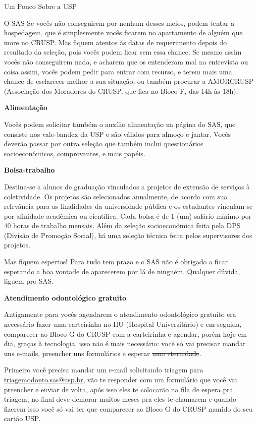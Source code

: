 \begin{secao}{Um Pouco Sobre a USP}
\begin{subsecao}{O SAS}
Se vocês não conseguirem por nenhum desses meios, podem tentar a hospedagem, que é
simplesmente vocês ficarem no apartamento de alguém que more no CRUSP. Mas fiquem
atentos às datas de requerimento depois do resultado da seleção, pois vocês podem
ficar sem essa chance. Se mesmo assim vocês não conseguirem nada,
e acharem que os entenderam mal na entrevista ou coisa assim, vocês podem pedir para
entrar com recurso, e terem mais uma chance de esclarecer melhor a sua situação, ou também
procurar a AMORCRUSP (Associação dos Moradores do CRUSP, que fica no Bloco F, das 14h às 18h).

{\bf Alimentação}

Vocês podem solicitar também o auxílio alimentação na página do SAS, que
consiste nos vale-bandex da USP e são válidos para almoço e jantar. Vocês deverão
passar por outra seleção que também inclui questionários socioeconômicos,
comprovantes, e mais papéis.

{\bf Bolsa-trabalho}

Destina-se a alunos de graduação vinculados a projetos de extensão de serviços à
coletividade. Os projetos são selecionados anualmente, de acordo com sua relevância
para as finalidades da universidade pública e os estudantes vinculam-se por
afinidade acadêmica ou científica. Cada bolsa é de 1 (um) salário mínimo por
40 horas de trabalho mensais. Além da seleção socioeconômica feita pela
DPS (Divisão de Promoção Social), há uma seleção técnica feita pelos supervisores
dos projetos.

Mas fiquem espertos! Para tudo tem prazo e o SAS não é obrigado a ficar esperando a
boa vontade de aparecerem por lá de ninguém. Qualquer dúvida, liguem pro SAS.

{\bf Atendimento odontológico gratuito}

Antigamente para vocês agendarem o atendimento odontológico gratuito era necessário fazer uma
carteirinha no HU (Hospital Universitário) e em seguida, comparecer ao Bloco G
do CRUSP com a carteirinha e agendar, porém hoje em dia, graças à tecnologia,
isso não é mais necessário: você só vai precisar mandar uns e-mails, preencher uns
formulários e esperar \sout{uma eternidade}.

Primeiro você precisa mandar um e-mail solicitando triagem para \url{triagemodonto.sas@usp.br},
vão te responder com um formulário que você vai preencher e enviar de volta, após isso eles
te colocarão na fila de espera pra triagem, no final deve demorar muitos meses pra
eles te chamarem e quando fizerem isso você só vai ter que comparecer ao Bloco G do CRUSP
munido do seu cartão USP.


\end{subsecao}
\end{secao}
